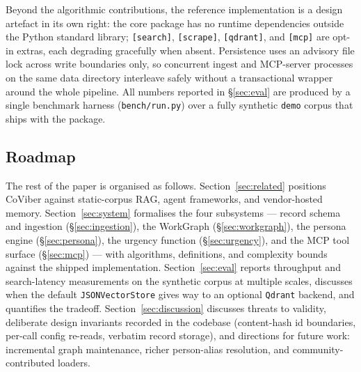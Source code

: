 Beyond the algorithmic contributions, the reference implementation is a design
artefact in its own right: the core package has no runtime dependencies outside
the Python standard library; \texttt{[search]}, \texttt{[scrape]},
\texttt{[qdrant]}, and \texttt{[mcp]} are opt-in extras, each degrading
gracefully when absent. Persistence uses an advisory file lock across write
boundaries only, so concurrent ingest and MCP-server processes on the same
data directory interleave safely without a transactional wrapper around the
whole pipeline. All numbers reported in \S\ref{sec:eval} are produced by a
single benchmark harness (\texttt{bench/run.py}) over a fully synthetic
\texttt{demo} corpus that ships with the package.

\subsection{Roadmap}
The rest of the paper is organised as follows. Section~\ref{sec:related}
positions CoViber against static-corpus RAG, agent frameworks, and
vendor-hosted memory. Section~\ref{sec:system} formalises the four subsystems
--- record schema and ingestion (\S\ref{sec:ingestion}), the WorkGraph
(\S\ref{sec:workgraph}), the persona engine (\S\ref{sec:persona}), the urgency
function (\S\ref{sec:urgency}), and the MCP tool surface (\S\ref{sec:mcp}) ---
with algorithms, definitions, and complexity bounds against the shipped
implementation. Section~\ref{sec:eval} reports throughput and search-latency
measurements on the synthetic corpus at multiple scales, discusses when the
default \texttt{JSONVectorStore} gives way to an optional \texttt{Qdrant}
backend, and quantifies the tradeoff. Section~\ref{sec:discussion} discusses
threats to validity, deliberate design invariants recorded in the codebase
(content-hash id boundaries, per-call config re-reads, verbatim record
storage), and directions for future work: incremental graph maintenance,
richer person-alias resolution, and community-contributed loaders.
